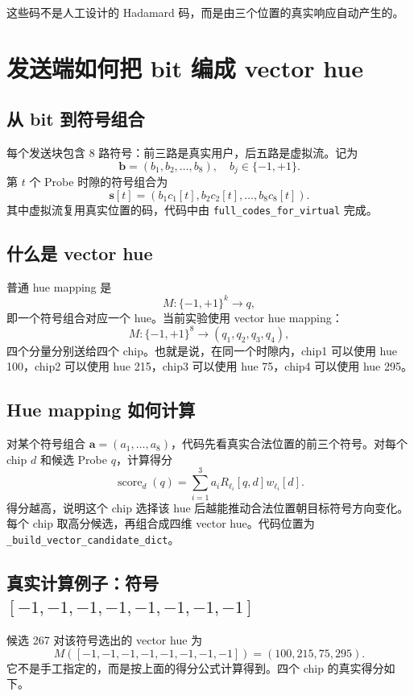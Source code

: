 \documentclass[UTF8,a4paper,11pt]{ctexart}
\begin{document}
这些码不是人工设计的 Hadamard 码，而是由三个位置的真实响应自动产生的。

\section{发送端如何把 bit 编成 vector hue}

\subsection{从 bit 到符号组合}

每个发送块包含 8 路符号：前三路是真实用户，后五路是虚拟流。记为
\[
\mathbf{b}=(b_1,b_2,\ldots,b_8),\quad b_j\in\{-1,+1\}.
\]
第 $t$ 个 Probe 时隙的符号组合为
\[
\mathbf{s}[t]=(b_1c_1[t],b_2c_2[t],\ldots,b_8c_8[t]).
\]
其中虚拟流复用真实位置的码，代码中由 \texttt{full\_codes\_for\_virtual} 完成。

\subsection{什么是 vector hue}

普通 hue mapping 是
\[
M:\{-1,+1\}^k\rightarrow q,
\]
即一个符号组合对应一个 hue。当前实验使用 vector hue mapping：
\[
M:\{-1,+1\}^{8}\rightarrow(q_1,q_2,q_3,q_4),
\]
四个分量分别送给四个 chip。也就是说，在同一个时隙内，chip1 可以使用 hue 100，chip2 可以使用 hue 215，chip3 可以使用 hue 75，chip4 可以使用 hue 295。

\subsection{Hue mapping 如何计算}

对某个符号组合 $\mathbf{a}=(a_1,\ldots,a_8)$，代码先看真实合法位置的前三个符号。对每个 chip $d$ 和候选 Probe $q$，计算得分
\[
\operatorname{score}_d(q)=\sum_{i=1}^{3} a_i R_{\ell_i}[q,d]w_{\ell_i}[d].
\]
得分越高，说明这个 chip 选择该 hue 后越能推动合法位置朝目标符号方向变化。每个 chip 取高分候选，再组合成四维 vector hue。代码位置为 \texttt{\_build\_vector\_candidate\_dict}。

\subsection{真实计算例子：符号 $[-1,-1,-1,-1,-1,-1,-1,-1]$}

候选 267 对该符号选出的 vector hue 为
\[
M([-1,-1,-1,-1,-1,-1,-1,-1])=(100,215,75,295).
\]
它不是手工指定的，而是按上面的得分公式计算得到。四个 chip 的真实得分如下。
\end{document}
